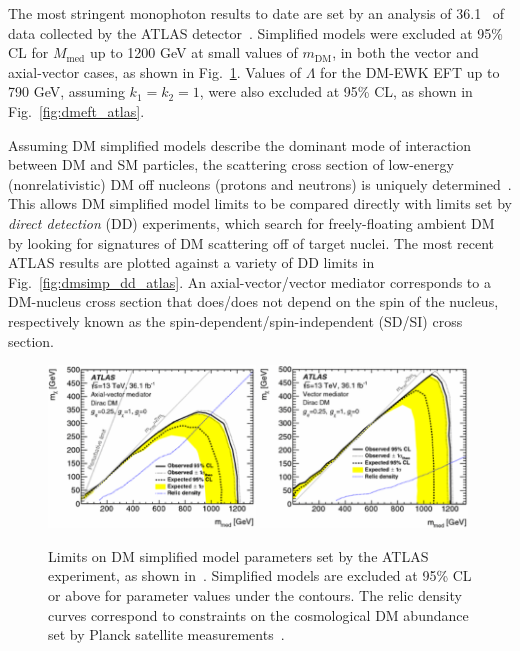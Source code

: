 \documentclass[oneside, letterpaper, 12pt, oldfontcommands]{memoir}
\begin{document}
The most stringent monophoton results to date are set by an analysis of 36.1 \fbinv\ of data collected by the ATLAS detector~\cite{ref:epjc/s10052-017-4965-8}.
Simplified models were excluded at 95\% CL for $M_\mathrm{med}$ up to 1200 GeV at small values of $m_\mathrm{DM}$, in both the vector and axial-vector cases, as shown in Fig.~\ref{fig:dmsimp_atlas}.
Values of $\Lambda$ for the DM-EWK EFT up to 790 GeV, assuming $k_{1} = k_{2} = 1$, were also excluded at 95\% CL, as shown in Fig.~\ref{fig:dmeft_atlas}.

Assuming DM simplified models describe the dominant mode of interaction between DM and SM particles, the scattering cross section of low-energy (nonrelativistic) DM off nucleons (protons and neutrons)
is uniquely determined~\cite{ref:1603.04156}. This allows DM simplified model limits to be compared directly with limits set by \textit{direct detection} (DD) experiments, which search for freely-floating
ambient DM by looking for signatures of DM scattering off of target nuclei.
The most recent ATLAS results are plotted against a variety of DD limits in Fig.~\ref{fig:dmsimp_dd_atlas}. An axial-vector/vector mediator corresponds to a DM-nucleus cross section
that does/does not depend on the spin of the nucleus, respectively known as the spin-dependent/spin-independent (SD/SI) cross section.

\begin{figure}[hbtb]
  \begin{center}
    \includegraphics[width=0.49\textwidth]{Figures/dmsimp_atlas_av.png}
    \includegraphics[width=0.49\textwidth]{Figures/dmsimp_atlas_v.png}
    \caption{Limits on DM simplified model parameters set by the ATLAS experiment, as shown in~\cite{ref:epjc/s10052-017-4965-8}. Simplified models are excluded at 95\% CL or above
    for parameter values under the contours. The relic density curves correspond to constraints on the cosmological DM abundance set by Planck satellite measurements~\cite{ref:planck2018_cosparams}.
    }
    \label{fig:dmsimp_atlas}
  \end{center}
\end{figure}
\end{document}

